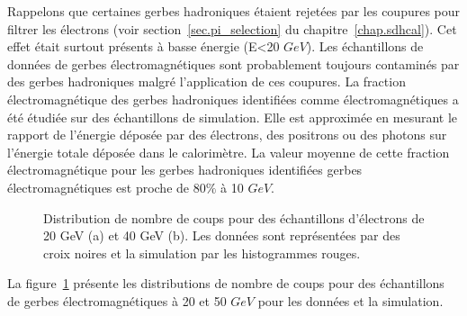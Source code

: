 Rappelons que certaines gerbes hadroniques étaient rejetées par les coupures pour filtrer les électrons (voir section~\ref{sec.pi_selection} du chapitre~\ref{chap.sdhcal}). Cet effet était surtout présents à basse énergie (E<20 $GeV$). Les échantillons de données de gerbes électromagnétiques sont probablement toujours contaminés par des gerbes hadroniques malgré l'application de ces coupures. La fraction électromagnétique des gerbes hadroniques identifiées comme électromagnétiques a été étudiée sur des échantillons de simulation. Elle est approximée en mesurant le rapport de l'énergie déposée par des électrons, des positrons ou des photons sur l'énergie totale déposée dans le calorimètre. La valeur moyenne de cette fraction électromagnétique pour les gerbes hadroniques identifiées gerbes électromagnétiques est proche de 80$\%$ à 10 $GeV$.
\begin{figure}[!ht]
    \caption{Distribution de nombre de coups pour des échantillons d'électrons de 20 GeV (a) et 40 GeV (b). Les données sont représentées par des croix noires et la simulation par les histogrammes rouges.}
  \label{fig.nhite-_dist}
\end{figure}
La figure~\ref{fig.nhite-_dist} présente les distributions de nombre de coups pour des échantillons de gerbes électromagnétiques à 20 et 50 $GeV$ pour les données et la simulation. 
